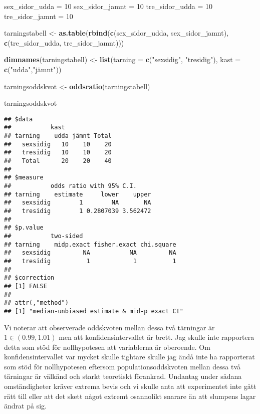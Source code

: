 \documentclass[]{article}
\newenvironment{Shaded}{\begin{snugshade}}{\end{snugshade}}
\newcommand{\DataTypeTok}[1]{\textcolor[rgb]{0.13,0.29,0.53}{#1}}
\newcommand{\DecValTok}[1]{\textcolor[rgb]{0.00,0.00,0.81}{#1}}
\newcommand{\KeywordTok}[1]{\textcolor[rgb]{0.13,0.29,0.53}{\textbf{#1}}}
\newcommand{\NormalTok}[1]{#1}
\newcommand{\StringTok}[1]{\textcolor[rgb]{0.31,0.60,0.02}{#1}}
\begin{document}
\begin{Shaded}
\begin{Highlighting}[]
\NormalTok{sex_sidor_udda =}\StringTok{ }\DecValTok{10}
\NormalTok{sex_sidor_jamnt =}\StringTok{ }\DecValTok{10}
\NormalTok{tre_sidor_udda =}\StringTok{ }\DecValTok{10}
\NormalTok{tre_sidor_jamnt =}\StringTok{ }\DecValTok{10}

\NormalTok{tarningstabell <-}\StringTok{ }\KeywordTok{as.table}\NormalTok{(}\KeywordTok{rbind}\NormalTok{(}\KeywordTok{c}\NormalTok{(sex_sidor_udda, sex_sidor_jamnt), }\KeywordTok{c}\NormalTok{(tre_sidor_udda, tre_sidor_jamnt)))}

\KeywordTok{dimnames}\NormalTok{(tarningstabell) <-}\StringTok{ }\KeywordTok{list}\NormalTok{(}\DataTypeTok{tarning =} \KeywordTok{c}\NormalTok{(}\StringTok{"sexsidig"}\NormalTok{, }\StringTok{"tresidig"}\NormalTok{), }\DataTypeTok{kast =} \KeywordTok{c}\NormalTok{(}\StringTok{"udda"}\NormalTok{,}\StringTok{"jämnt"}\NormalTok{))}


\NormalTok{tarningsoddskvot <-}\StringTok{ }\KeywordTok{oddsratio}\NormalTok{(tarningstabell)}

\NormalTok{tarningsoddskvot }
\end{Highlighting}
\end{Shaded}

\begin{verbatim}
## $data
##           kast
## tarning    udda jämnt Total
##   sexsidig   10    10    20
##   tresidig   10    10    20
##   Total      20    20    40
## 
## $measure
##           odds ratio with 95% C.I.
## tarning    estimate     lower    upper
##   sexsidig        1        NA       NA
##   tresidig        1 0.2807039 3.562472
## 
## $p.value
##           two-sided
## tarning    midp.exact fisher.exact chi.square
##   sexsidig         NA           NA         NA
##   tresidig          1            1          1
## 
## $correction
## [1] FALSE
## 
## attr(,"method")
## [1] "median-unbiased estimate & mid-p exact CI"
\end{verbatim}

Vi noterar att observerade oddskvoten mellan dessa två tärningar är
\(1 \in (0.99, 1.01)\) men att konfidensintervallet är brett. Jag skulle
inte rapportera detta som stöd för nollhypotesen att variablerna är
oberoende. Om konfidensintervallet var mycket skulle tightare skulle jag
ändå inte ha rapporterat som stöd för nollhypotesen eftersom
populationsoddskvoten mellan dessa två tärningar är välkänd och starkt
teoretiskt förankrad. Undantag under sådana omständigheter kräver
extrema bevis och vi skulle anta att experimentet inte gått rätt till
eller att det skett något extremt osannolikt snarare än att slumpens
lagar ändrat på sig.
\end{document}
